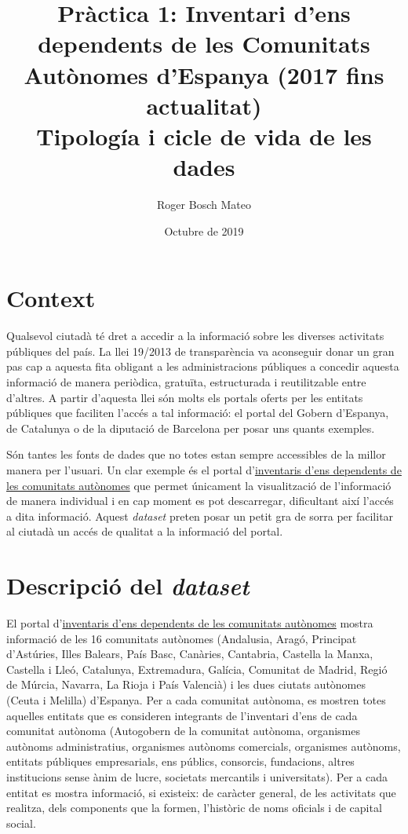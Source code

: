 \documentclass[12pt]{article}
\title{%
Pràctica 1: Inventari d'ens dependents de les Comunitats Autònomes d'Espanya (2017 fins actualitat)\\
\large Tipología i cicle de vida de les dades}
\author{Roger Bosch Mateo}
\date{Octubre de 2019}
\begin{document}
\maketitle

\section*{Context}
Qualsevol ciutadà té dret a accedir a la informació sobre les diverses activitats públiques del país. La llei 19/2013 de transparència va aconseguir donar un gran pas cap a aquesta fita obligant a les administracions públiques a concedir aquesta informació de manera periòdica, gratuïta, estructurada i reutilitzable entre d'altres. A partir d'aquesta llei són molts els portals oferts per les entitats públiques que faciliten l'accés a tal informació: el portal del Gobern d'Espanya, de Catalunya o de la diputació de Barcelona per posar uns quants exemples.\par
Són tantes les fonts de dades que no totes estan sempre accessibles de la millor manera per l'usuari. 
Un clar exemple és el portal d'\href{https://serviciostelematicosext.hacienda.gob.es/SGCIEF/PubInvCCAA/secciones/FrmSelComunidad.aspx}{inventaris d'ens dependents de les comunitats autònomes} que permet únicament la visualització de l'informació de manera individual i en cap moment es pot descarregar, dificultant així l'accés a dita informació.
Aquest \textit{dataset} preten posar un petit gra de sorra per facilitar al ciutadà un accés de qualitat a la informació del portal.

\section*{Descripció del \textit{dataset}}
El portal d'\href{https://serviciostelematicosext.hacienda.gob.es/SGCIEF/PubInvCCAA/secciones/FrmSelComunidad.aspx}{inventaris d'ens dependents de les comunitats autònomes} mostra informació de les 16 comunitats autònomes (Andalusia, Aragó, Principat d'Astúries, Illes Balears, País Basc, Canàries, Cantabria, Castella la Manxa, Castella i Lleó, Catalunya, Extremadura, Galícia, Comunitat de Madrid, Regió de Múrcia, Navarra, La Rioja i País Valencià) i les dues ciutats autònomes (Ceuta i Melilla) d'Espanya. Per a cada comunitat autònoma, es mostren totes aquelles entitats que es consideren integrants de l'inventari d'ens de cada comunitat autònoma (Autogobern de la comunitat autònoma, organismes autònoms administratius, organismes autònoms comercials, organismes autònoms, entitats públiques empresarials, ens públics, consorcis, fundacions, altres institucions sense ànim de lucre, societats mercantils i universitats). Per a cada entitat es mostra informació, si existeix: de caràcter general, de les activitats que realitza, dels components que la formen, l'històric de noms oficials i de capital social.\par
\end{document}
